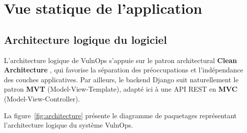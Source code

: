 \documentclass[12pt, a4paper, oneside]{report}
\begin{document}
\section{Vue statique de l'application}

\subsection{Architecture logique du logiciel}
\label{subsec:architecture_logique}

L'architecture logique de VulnOps s'appuie sur le patron architectural
\textbf{Clean Architecture} \cite{cleanarchitecture}, qui favorise la séparation
des préoccupations et l'indépendance des couches applicatives. Par ailleurs,
le backend Django suit naturellement le patron \textbf{MVT} (Model-View-Template),
adapté ici à une API REST en \textbf{MVC} (Model-View-Controller).

La figure~\ref{fig:architecture} présente le diagramme de paquetages représentant
l'architecture logique du système VulnOps.
\end{document}
